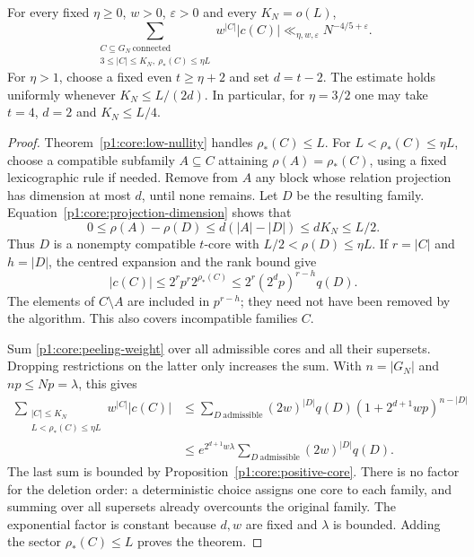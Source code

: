 \begin{theorem}
\label{p1:core:bounded-nullity}
For every fixed $\eta\ge0$, $w>0$, $\varepsilon>0$ and every
$K_N=o(L)$,
\begin{equation}
 \sum_{\substack{C\subseteq G_N\ \mathrm{connected}\\
          3\le|C|\le K_N,\ \rho_*(C)\le\eta L}}
 w^{|C|}|c(C)|\ll_{\eta,w,\varepsilon}N^{-4/5+\varepsilon}.
 \label{p1:core:bounded-nullity-bound}
\end{equation}
For $\eta>1$, choose a fixed even $t\ge\eta+2$ and set $d=t-2$.
The estimate holds uniformly whenever $K_N\le L/(2d)$. In particular,
for $\eta=3/2$ one may take $t=4$, $d=2$ and $K_N\le L/4$.
\end{theorem}
\begin{proof}
Theorem~\ref{p1:core:low-nullity} handles $\rho_*(C)\le L$.
For $L<\rho_*(C)\le\eta L$, choose a compatible subfamily
$A\subseteq C$ attaining $\rho(A)=\rho_*(C)$, using a fixed
lexicographic rule if needed. Remove from $A$ any block whose
relation projection has dimension at most $d$, until none remains.
Let $D$ be the resulting family. Equation~\eqref{p1:core:projection-dimension}
shows that
\[
 0\le\rho(A)-\rho(D)\le d(|A|-|D|)\le dK_N\le L/2.
\]
Thus $D$ is a nonempty compatible $t$-core with
$L/2<\rho(D)\le\eta L$.
If $r=|C|$ and $h=|D|$, the centred expansion and the rank bound give
\begin{equation}
 |c(C)|\le2^r p^r2^{\rho_*(C)}
        \le2^r(2^dp)^{r-h}q(D).
 \label{p1:core:peeling-weight}
\end{equation}
The elements of $C\setminus A$ are included in $p^{r-h}$; they need
not have been removed by the algorithm. This also covers incompatible
families $C$.

Sum \eqref{p1:core:peeling-weight} over all admissible cores and all
their supersets. Dropping restrictions on the latter only increases
the sum. With $n=|G_N|$ and $np\le Np=\lambda$, this gives
\begin{align*}
 \sum_{\substack{|C|\le K_N\\L<\rho_*(C)\le\eta L}}
 w^{|C|}|c(C)|
 &\le\sum_{D\ \mathrm{admissible}}(2w)^{|D|}q(D)
        (1+2^{d+1}wp)^{n-|D|}\\
 &\le e^{2^{d+1}w\lambda}
        \sum_{D\ \mathrm{admissible}}(2w)^{|D|}q(D).
\end{align*}
The last sum is bounded by Proposition~\ref{p1:core:positive-core}.
There is no factor for the deletion order: a deterministic choice
assigns one core to each family, and summing over all supersets already
overcounts the original family. The exponential factor is constant
because $d,w$ are fixed and $\lambda$ is bounded. Adding the sector
$\rho_*(C)\le L$ proves the theorem.
\end{proof}

